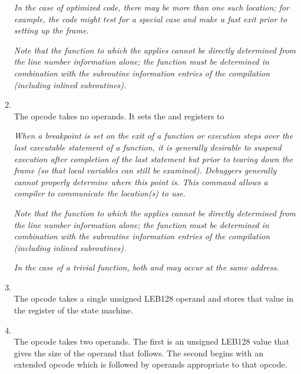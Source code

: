 \begin{enumerate}[1. ]
\textit{In the case of optimized code, there may be more than one such
location; for example, the code might test for a special case
and make a fast exit prior to setting up the frame.}

\textit{Note that the function to which the 
 applies cannot
be directly determined from the line number information alone;
\bb
the function
\eb
must be determined in combination with the subroutine
information entries of the compilation (including inlined
subroutines).}

\item \textbf{\DWLNSsetepiloguebeginTARG} \\
The \DWLNSsetepiloguebeginNAME{} opcode takes no operands. It
sets the  
\bb
and  registers
\eb
to 

\textit{When a breakpoint is set on the exit of a function or execution
steps over the last executable statement of a function, it is
generally desirable to suspend execution after completion of
the last statement but prior to tearing down the frame (so that
local variables can still be examined). Debuggers generally
cannot properly determine where this point is. This command
allows a compiler to communicate the location(s) to use.}

\textit{Note that the function to which the 
 applies cannot
be directly determined from the line number information alone;
\bb
the function
\eb
must be determined in combination with the subroutine
information entries of the compilation (including inlined
subroutines).}

\textit{In the case of a trivial function, both 
 and
 may occur at the same address.}

\item \textbf{\DWLNSsetisaTARG} \\
The \DWLNSsetisaNAME{} opcode takes a single
unsigned LEB128 operand and stores that value in the 
register of the state machine.

\item \textbf{\DWLNSextendedopTARG} \\
\bb
The \DWLNSextendedopNAME{} opcode takes two operands. The first is an
unsigned LEB128 value that gives the size of the operand that follows.
The second begins with an extended opcode which is followed by
operands appropriate to that opcode.
\eb

\end{enumerate}

